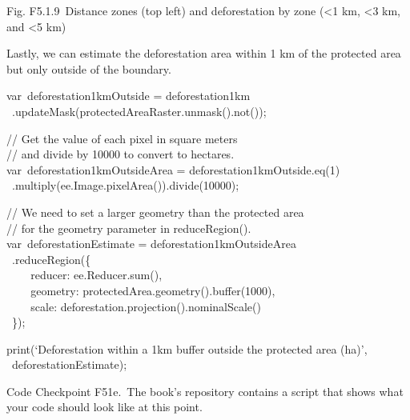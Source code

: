 \documentclass[
  letterpaper,
  DIV=11,
  numbers=noendperiod]{scrreprt}
\begin{document}
Fig. F5.1.9~Distance zones (top left) and deforestation by zone
(\textless1 km, \textless3 km, and \textless5 km)

Lastly, we can estimate the deforestation area within 1 km of the
protected area but only outside of the boundary.

var~deforestation1kmOutside = deforestation1km\\
\hspace*{0.333em} ~.updateMask(protectedAreaRaster.unmask().not());

// Get the value of each pixel in square meters\\
// and divide by 10000 to convert to hectares.\\
var~deforestation1kmOutsideArea = deforestation1kmOutside.eq(1)\\
\hspace*{0.333em} ~.multiply(ee.Image.pixelArea()).divide(10000);

// We need to set a larger geometry than the protected area\\
// for the geometry parameter in reduceRegion().\\
var~deforestationEstimate = deforestation1kmOutsideArea\\
\hspace*{0.333em} ~.reduceRegion(\{\\
\hspace*{0.333em} ~ ~ ~reducer: ee.Reducer.sum(),\\
\hspace*{0.333em} ~ ~ ~geometry:
protectedArea.geometry().buffer(1000),\\
\hspace*{0.333em} ~ ~ ~scale:
deforestation.projection().nominalScale()\\
\hspace*{0.333em} ~\});

print(`Deforestation within a 1km buffer outside the protected area
(ha)',\\
\hspace*{0.333em} ~deforestationEstimate);

\begin{tcolorbox}[enhanced jigsaw, left=2mm, breakable, rightrule=.15mm, opacityback=0, colframe=quarto-callout-note-color-frame, colbacktitle=quarto-callout-note-color!10!white, arc=.35mm, opacitybacktitle=0.6, toptitle=1mm, colback=white, leftrule=.75mm, title=\textcolor{quarto-callout-note-color}{\faInfo}\hspace{0.5em}{Note}, toprule=.15mm, bottomtitle=1mm, titlerule=0mm, bottomrule=.15mm, coltitle=black]

Code Checkpoint F51e.~The book's repository contains a script that shows
what your code should look like at this point.

\end{tcolorbox}
\end{document}
